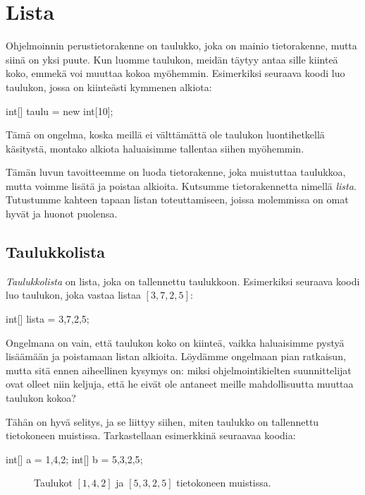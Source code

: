 \chapter{Lista}

Ohjelmoinnin perustietorakenne on taulukko,
joka on mainio tietorakenne, mutta siinä on yksi puute.
Kun luomme taulukon, meidän täytyy antaa sille
kiinteä koko, emmekä voi muuttaa kokoa myöhemmin.
Esimerkiksi seuraava koodi luo taulukon,
jossa on kiinteästi kymmenen alkiota:

\begin{code}
int[] taulu = new int[10];
\end{code}

Tämä on ongelma, koska meillä ei välttämättä ole
taulukon luontihetkellä käsitystä, montako alkiota
haluaisimme tallentaa siihen myöhemmin.

Tämän luvun tavoitteemme on luoda tietorakenne,
joka muistuttaa taulukkoa, mutta voimme
lisätä ja poistaa alkioita.
Kutsumme tietorakennetta nimellä \emph{lista}.
Tutustumme kahteen tapaan listan toteuttamiseen,
joissa molemmissa on omat hyvät ja huonot puolensa.

\section{Taulukkolista}

\emph{Taulukkolista} on lista, joka on tallennettu taulukkoon.
Esimerkiksi seuraava koodi luo taulukon,
joka vastaa listaa $[3,7,2,5]$:

\begin{code}
int[] lista = {3,7,2,5};
\end{code}

Ongelmana on vain, että taulukon koko on kiinteä,
vaikka haluaisimme pystyä lisäämään ja poistamaan
listan alkioita.
Löydämme ongelmaan pian ratkaisun, mutta sitä ennen
aiheellinen kysymys on:
miksi ohjelmointikielten suunnittelijat ovat olleet niin keljuja,
että he eivät ole antaneet meille mahdollisuutta muuttaa
taulukon kokoa?

Tähän on hyvä selitys, ja se liittyy siihen,
miten taulukko on tallennettu tietokoneen muistissa.
Tarkastellaan esimerkkinä seuraavaa koodia:

\begin{code}
int[] a = {1,4,2};
int[] b = {5,3,2,5};
\end{code}

\begin{figure}
\center
{}
\caption{Taulukot $[1,4,2]$ ja $[5,3,2,5]$ tietokoneen muistissa.}
\label{fig:taumui}
\end{figure}

